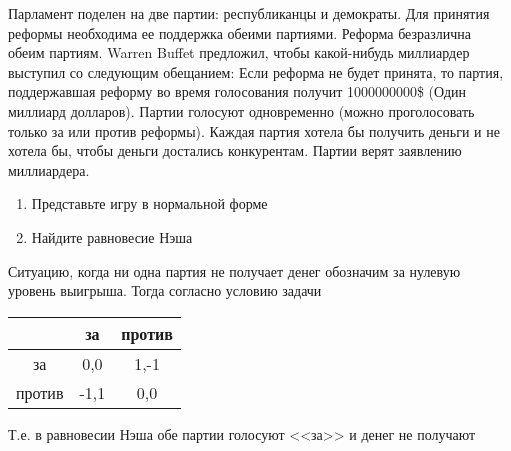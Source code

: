 \begin{problem}
Парламент поделен на две партии: республиканцы и демократы. Для принятия реформы необходима ее поддержка обеими партиями. Реформа безразлична обеим партиям. Warren Buffet предложил, чтобы какой-нибудь миллиардер выступил со следующим обещанием: Если реформа не будет принята, то партия, поддержавшая реформу во время голосования получит 1000000000\$ (Один миллиард долларов). Партии голосуют одновременно (можно проголосовать только за или против реформы). Каждая партия хотела бы получить деньги и не хотела бы, чтобы деньги достались конкурентам. Партии верят заявлению миллиардера.
\begin{enumerate}
\item  Представьте игру в нормальной форме
\item Найдите равновесие Нэша
\end{enumerate}


\begin{sol}
Ситуацию, когда ни одна партия не получает денег обозначим за нулевую уровень выигрыша. Тогда согласно условию задачи

\begin{tabular}{c|cc}
 & за & против \\
\hline
за & 0,0 & 1,-1 \\
против & -1,1 & 0,0
\end{tabular}

Т.е. в равновесии Нэша обе партии голосуют <<за>> и денег не получают
\end{sol}
\end{problem}

